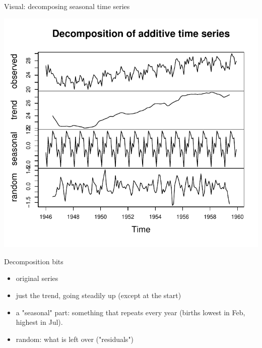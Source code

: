\begin{frame}[fragile]{Visual: decomposing seasonal time series}
  
\begin{knitrout}
\color{fgcolor}\begin{kframe}
\begin{alltt}
\hlkwb{=}
\end{alltt}
\end{kframe}
\includegraphics[width=\maxwidth]{figure/askjasklslak-1} 

\end{knitrout}
  
\end{frame}

\begin{frame}{Decomposition bits}
  
  \begin{itemize}
\item original series
\item just the trend, going steadily up (except at the start)
\item a "seasonal" part: something that repeats every year (births
  lowest in Feb, highest in Jul).
\item random: what is left over ("residuals")
  \end{itemize}
  
\end{frame}


